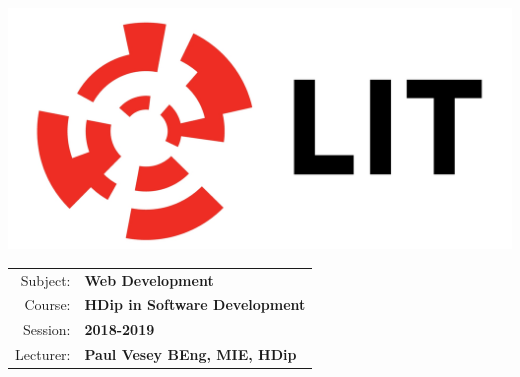 \documentclass[a4paper, 10pt]{article}
\begin{document}
\lstset{language=HTML,
				basicstyle=\small,
				breaklines=true,
        numbers=left,
        numberstyle=\tiny,
        showstringspaces=false,
        aboveskip=-20pt,
        frame=leftline
        }
				
\begin{table}%
	\begin{minipage}{0.4\textwidth}%
			\includegraphics[width=1\textwidth]{img/LITlogo.jpg}
	\end{minipage}
	\qquad
	\centering
	\parbox{0.4\textwidth}{
		\begin{large}			
			\begin{tabular}{| r | l |} \hline
				Subject: & \textbf{Web Development}\\
				Course: & \textbf{HDip in Software Development}\\
				Session: & \textbf{2018-2019}\\
				Lecturer: & \textbf{Paul Vesey \footnotesize{BEng, MIE, HDip}}\\
				\hline
			\end{tabular}
		\end{large}			
	}
\end{table}
\vspace{0.25cm}	
\end{document}
